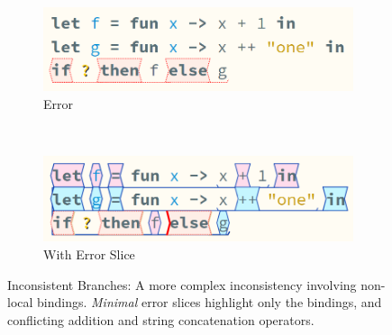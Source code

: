 \begin{figure}[h]
\centering
\begin{subfigure}{0.4\textwidth}
\centering
\includegraphics[width=1\textwidth]{Media/Figures/inconsistent_branches_example}
\caption{Error}
\end{subfigure}$\qquad$
\begin{subfigure}{0.4\textwidth}
\centering
\includegraphics[width=1\textwidth]{Media/Figures/inconsistent_branches_example_sliced}
\caption{With Error Slice}
\end{subfigure}
\caption{Inconsistent Branches: A more complex inconsistency involving non-local bindings. \textit{Minimal} error slices highlight only the bindings, and conflicting addition and string concatenation operators.}
\label{fig:InconsistentBranchesExample}
\end{figure}

